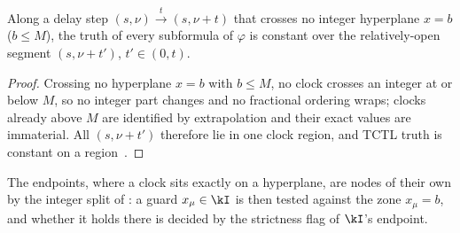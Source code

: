 %
\begin{lemma}\label{lem:stability}
Along a delay step $(s,\nu)\xrightarrow{t}(s,\nu+t)$ that crosses no integer hyperplane $x=b$ ($b\le M$), the
truth of every subformula of $\varphi$ is constant over the relatively-open segment $(s,\nu+t')$,
$t'\in(0,t)$.
\end{lemma}

\begin{proof}
Crossing no hyperplane $x=b$ with $b\le M$, no clock crosses an integer at or below $M$, so
no integer part changes and no fractional ordering wraps; clocks already above $M$ are
identified by extrapolation and their exact values are immaterial. All $(s,\nu+t')$
therefore lie in one clock region, and TCTL truth is constant on a
region~\cite{AlurCourcoubetisDill1990,Bouyer05TimedAutomata}.
\end{proof}
\noindent
The endpoints, where a clock sits exactly on a hyperplane, are nodes of their own by the
integer split of : a guard $x_\mu\in\kI$ is then tested against the zone
$x_\mu=b$, and whether it holds there is decided by the strictness flag of $\kI$'s endpoint.


